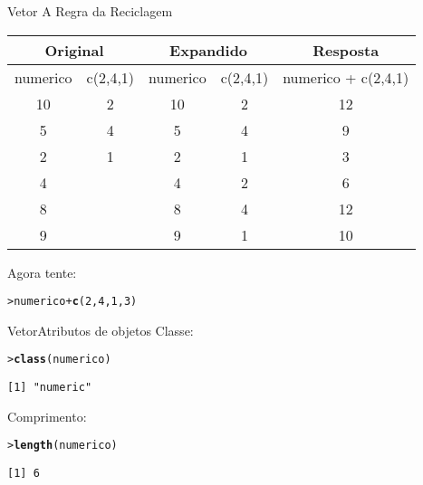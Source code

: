 \documentclass[10pt,handout]{beamer}\usepackage{graphicx, color}
\makeatletter
\newcommand{\hlfunctioncall}[1]{\textcolor[rgb]{0,0,0.545098039215686}{\textbf{#1}}}%
\newenvironment{kframe}{%
 \def\at@end@of@kframe{}%
 \ifinner\ifhmode%
  \def\at@end@of@kframe{\end{minipage}}%
  \begin{minipage}{\columnwidth}%
 \fi\fi%
 \def\FrameCommand##1{\hskip\@totalleftmargin \hskip-\fboxsep
 \colorbox{shadecolor}{##1}\hskip-\fboxsep
     \hskip-\linewidth \hskip-\@totalleftmargin \hskip\columnwidth}%
 \MakeFramed {\advance\hsize-\width
   \@totalleftmargin\z@ \linewidth\hsize
   \@setminipage}}%
 {\par\unskip\endMakeFramed%
 \at@end@of@kframe}
\newenvironment{knitrout}{}{} %
\makeatother
\begin{document}
\begin{frame}[fragile=singleslide]{Vetor}
A Regra da Reciclagem
\begin{table}[htbp]
\begin{center}
\begin{tabular}{|c|c|c|c|c|c|}
\hline
\multicolumn{ 2}{|c|}{Original} & \multicolumn{ 2}{c|}{Expandido} & \multicolumn{ 2}{c|}{Resposta} \\ \hline
numerico & c(2,4,1) & numerico & c(2,4,1) & \multicolumn{ 2}{c|}{numerico + c(2,4,1)} \\ \hline
10 & 2 & 10 & 2 & \multicolumn{ 2}{c|}{12} \\ \hline
5 & 4 & 5 & 4 & \multicolumn{ 2}{c|}{9} \\ \hline
2 & 1 & 2 & 1 & \multicolumn{ 2}{c|}{3} \\ \hline
4 &  & 4 & 2 & \multicolumn{ 2}{c|}{6} \\ \hline
8 &  & 8 & 4 & \multicolumn{ 2}{c|}{12} \\ \hline
9 &  & 9 & 1 & \multicolumn{ 2}{c|}{10} \\ \hline
\end{tabular}
\end{center}
\end{table}
Agora tente:
\begin{knitrout}\small
{}\color{fgcolor}\begin{kframe}
\begin{alltt}
> numerico + \hlfunctioncall{c}(2, 4, 1, 3)
\end{alltt}
\end{kframe}
\end{knitrout}


\end{frame}

\begin{frame}[fragile=singleslide]{Vetor}{Atributos de objetos}
Classe:
\begin{knitrout}\small
{}\color{fgcolor}\begin{kframe}
\begin{alltt}
> \hlfunctioncall{class}(numerico)
\end{alltt}
\begin{verbatim}
[1] "numeric"
\end{verbatim}
\end{kframe}
\end{knitrout}

Comprimento:
\begin{knitrout}\small
{}\color{fgcolor}\begin{kframe}
\begin{alltt}
> \hlfunctioncall{length}(numerico)
\end{alltt}
\begin{verbatim}
[1] 6
\end{verbatim}
\end{kframe}
\end{knitrout}

\end{frame}
\end{document}
